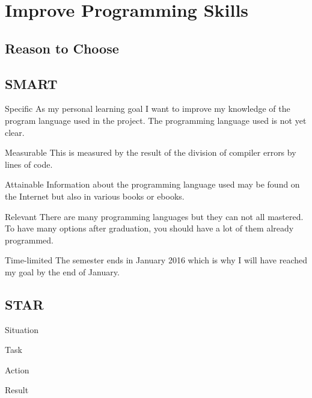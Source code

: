 \section{Improve Programming Skills}
	\subsection{Reason to Choose}
		

    \subsection{SMART}
		\begin{SMART}
		    \item[Specific] As my personal learning goal I want to improve my knowledge of the program language used in the project. The programming language used is not yet clear.
		    \item[Measurable] This is measured by the result of the division of compiler errors by lines of code.
			\item[Attainable] Information about the programming language used may be found on the Internet but also in various books or ebooks.
			\item[Relevant] There are many programming languages but they can not all mastered. To have many options after graduation, you should have a lot of them already programmed.
		    \item[Time-limited] The semester ends in January 2016 which is why I will have reached my goal by the end of January.
		\end{SMART}

	\subsection{STAR}
		\begin{STAR}
		    \item[Situation] 
		    \item[Task] 
		    \item[Action] 
		    \item[Result] 
		\end{STAR}